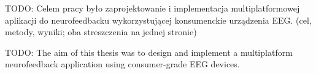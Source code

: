 \begin{abstracts}
  \AbstractPL
	TODO: Celem pracy było zaprojektowanie i implementacja multiplatformowej aplikacji do neurofeedbacku wykorzystującej konsumenckie urządzenia EEG. (cel, metody, wyniki; oba streszczenia na jednej stronie)

	\AbstractENG
	TODO: The aim of this thesis was to design and implement a multiplatform neurofeedback application using consumer-grade EEG devices.
\end{abstracts}
